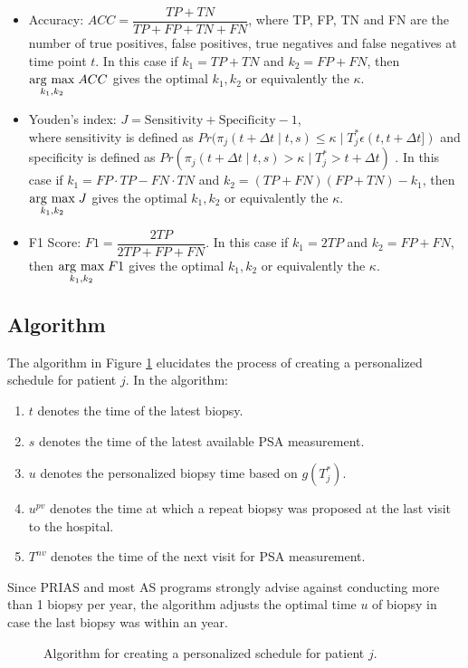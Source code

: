 \begin{itemize}
\item Accuracy: $ACC = \dfrac{TP + TN}{TP + FP + TN + FN}$, where TP, FP, TN and FN are the number of true positives, false positives, true negatives and false negatives at time point $t$. In this case if $k_1 = TP + TN$ and $k_2 = FP + FN$, then $\underset{k_1, k_2}{\operatorname{arg}\,\operatorname{max}}\; ACC$ gives the optimal $k_1, k_2$ or equivalently the $\kappa$.

\item Youden's index: $J = \text{Sensitivity} + \text{Specificity}- 1$,\\
where sensitivity is defined as $Pr(\pi_j(t + \Delta t \mid t,s) \leq \kappa \mid T^*_j \epsilon (t, t + \Delta t])$ and specificity is defined as $Pr(\pi_j(t + \Delta t \mid t,s) > \kappa \mid T^*_j > t + \Delta t)$ \citep{rizopoulosJMbayes}. In this case if $k_1 = FP \cdot TP - FN \cdot TN$ and $k_2 = (TP+FN)(FP+TN) - k_1$, then $\underset{k_1, k_2}{\operatorname{arg}\,\operatorname{max}}\; J$ gives the optimal $k_1, k_2$ or equivalently the $\kappa$.

\item F1 Score: $F1 = \dfrac{2TP}{2TP + FP + FN}$. In this case if $k_1 = 2TP$ and $k_2 = FP + FN$, then $\underset{k_1, k_2}{\operatorname{arg}\,\operatorname{max}}\; F1$ gives the optimal $k_1, k_2$ or equivalently the $\kappa$.
\end{itemize}

\subsection{Algorithm}
The algorithm in Figure \ref{fig : sched_algorithm} elucidates the process of creating a personalized schedule for patient $j$. In the algorithm:

\begin{enumerate}
\item $t$ denotes the time of the latest biopsy.
\item $s$ denotes the time of the latest available PSA measurement.
\item $u$ denotes the personalized biopsy time based on $g(T^*_j)$.
\item $u^{pv}$ denotes the time at which a repeat biopsy was proposed at the last visit to the hospital.
\item $T^{nv}$ denotes the time of the next visit for PSA measurement.
\end{enumerate}
Since PRIAS and most AS programs strongly advise against conducting more than 1 biopsy per year, the algorithm adjusts the optimal time $u$ of biopsy in case the last biopsy was within an year.

\begin{figure}
\centering
\captionsetup{justification=centering}

\caption{Algorithm for creating a personalized schedule for patient $j$.} 
\label{fig : sched_algorithm}
\end{figure}